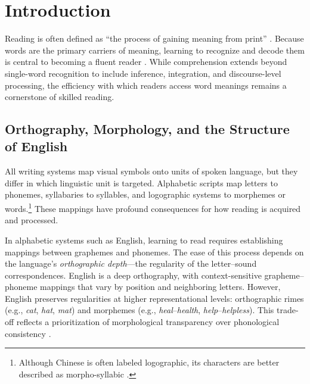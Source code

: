 \section{Introduction}

Reading is often defined as “the process of gaining meaning from print” \citep[][p.~34]{raynerHowPsychologicalScience2001}. Because words are the primary carriers of meaning, learning to recognize and decode them is central to becoming a fluent reader \citep[e.g.,][]{castlesEndingReadingWars2018}. While comprehension extends beyond single-word recognition to include inference, integration, and discourse-level processing, the efficiency with which readers access word meanings remains a cornerstone of skilled reading.

\subsection{Orthography, Morphology, and the Structure of English}

All writing systems map visual symbols onto units of spoken language, but they differ in which linguistic unit is targeted. Alphabetic scripts map letters to phonemes, syllabaries to syllables, and logographic systems to morphemes or words.\footnote{Although Chinese is often labeled logographic, its characters are better described as morpho-syllabic \citep{raynerHowPsychologicalScience2001}.} These mappings have profound consequences for how reading is acquired and processed. 

In alphabetic systems such as English, learning to read requires establishing mappings between graphemes and phonemes. The ease of this process depends on the language’s \textit{orthographic depth}—the regularity of the letter–sound correspondences. English is a deep orthography, with context-sensitive grapheme–phoneme mappings that vary by position and neighboring letters. However, English preserves regularities at higher representational levels: orthographic rimes (e.g., \textit{cat}, \textit{hat}, \textit{mat}) and morphemes (e.g., \textit{heal}–\textit{health}, \textit{help}–\textit{helpless}). This trade-off reflects a prioritization of morphological transparency over phonological consistency \citep{zieglerReadingAcquisitionDevelopmental2005, rastlePlaceMorphologyLearning2019}. 

